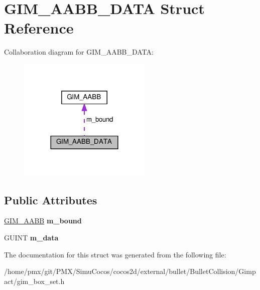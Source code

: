 \hypertarget{structGIM__AABB__DATA}{}\section{G\+I\+M\+\_\+\+A\+A\+B\+B\+\_\+\+D\+A\+TA Struct Reference}
\label{structGIM__AABB__DATA}


Collaboration diagram for G\+I\+M\+\_\+\+A\+A\+B\+B\+\_\+\+D\+A\+TA\+:
\nopagebreak
\begin{figure}[H]
\begin{center}
\leavevmode
\includegraphics[width=180pt]{structGIM__AABB__DATA__coll__graph}
\end{center}
\end{figure}
\subsection*{Public Attributes}
\begin{DoxyCompactItemize}
\item 
\mbox{\label{structGIM__AABB__DATA_a0bcb619d705ecdc4c6d663ca7dee3755}} 
\hyperlink{classGIM__AABB}{G\+I\+M\+\_\+\+A\+A\+BB} {\bfseries m\+\_\+bound}
\item 
\mbox{\label{structGIM__AABB__DATA_ab78bc93dfa158b5fc01a6a1d4d1bfd0a}} 
G\+U\+I\+NT {\bfseries m\+\_\+data}
\end{DoxyCompactItemize}


The documentation for this struct was generated from the following file\+:\begin{DoxyCompactItemize}
\item 
/home/pmx/git/\+P\+M\+X/\+Simu\+Cocos/cocos2d/external/bullet/\+Bullet\+Collision/\+Gimpact/gim\+\_\+box\+\_\+set.\+h\end{DoxyCompactItemize}
